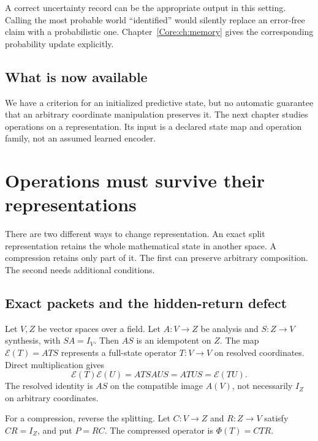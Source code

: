 A correct uncertainty record can be the appropriate output in this setting. Calling the most probable world ``identified'' would silently replace an error-free claim with a probabilistic one. Chapter~\ref{Core:ch:memory} gives the corresponding probability update explicitly.

\section*{What is now available}
We have a criterion for an initialized predictive state, but no automatic guarantee that an arbitrary coordinate manipulation preserves it. The next chapter studies operations on a representation. Its input is a declared state map and operation family, not an assumed learned encoder.


\chapter{Operations must survive their representations}\label{Core:book:chapter-2}
\setcounter{section}{0}\label{Core:ch:operations}
There are two different ways to change representation. An exact split representation retains the whole mathematical state in another space. A compression retains only part of it. The first can preserve arbitrary composition. The second needs additional conditions.

\section{Exact packets and the hidden-return defect}
Let $V,Z$ be vector spaces over a field. Let $A:V\to Z$ be analysis and $S:Z\to V$ synthesis, with $SA=I_V$. Then $AS$ is an idempotent on $Z$. The map $\mathcal E(T)=ATS$ represents a full-state operator $T:V\to V$ on resolved coordinates. Direct multiplication gives
\[
\mathcal E(T)\mathcal E(U)=ATSAUS=ATUS=\mathcal E(TU).
\]
The resolved identity is $AS$ on the compatible image $A(V)$, not necessarily $I_Z$ on arbitrary coordinates.

For a compression, reverse the splitting. Let $C:V\to Z$ and $R:Z\to V$ satisfy $CR=I_Z$, and put $P=RC$. The compressed operator is $\Phi(T)=CTR$.


